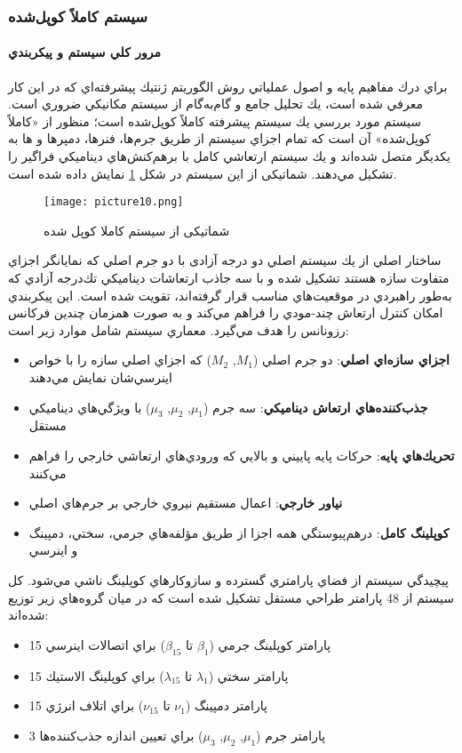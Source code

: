 \subsubsection{ سيستم كاملاً كوپل‌شده }
\paragraph{مرور كلي سيستم و پيكربندي}

براي درك مفاهيم پايه و اصول عملياتي روش الگوريتم ژنتيك پيشرفته‌اي كه در اين كار معرفي شده است، يك تحليل جامع و گام‌به‌گام از سيستم مكانيكي ضروري است. سيستم مورد بررسي يك سيستم پيشرفته كاملاً كوپل‌شده  است؛ منظور از «كاملاً كوپل‌شده» آن است كه تمام اجزاي سيستم از طريق جرم‌ها، فنرها، دمپرها و ‌ها به يكديگر متصل شده‌اند و يك سيستم ارتعاشي كامل با برهم‌كنش‌هاي ديناميكي فراگير را تشكيل مي‌دهند. شماتیکی از این سیستم در شکل 
\ref{fig:2DOF-3DOF schematic}
نمایش داده شده است. 

\begin{figure}
  \centering
  \texttt{[image: picture10.png]}
  \caption{شماتیکی از سیستم کاملا کوپل شده }\label{fig:2DOF-3DOF schematic}
\end{figure}


ساختار اصلي از يك سيستم اصلي دو درجه آزادی با دو جرم اصلي كه نمايانگر اجزاي متفاوت سازه هستند تشكيل شده و با سه جاذب‌ ارتعاشات ديناميكي  تك‌درجه آزادي كه به‌طور راهبردي در موقعيت‌هاي مناسب قرار گرفته‌اند، تقويت شده است. اين پيكربندي امكان كنترل ارتعاش چند-مودي را فراهم مي‌كند و به صورت همزمان چندين فركانس رزونانس را هدف مي‌گيرد. معماري سيستم شامل موارد زير است:

\begin{itemize}
    \item \textbf{اجزاي سازه‌اي اصلي}: دو جرم اصلي ($M_1$, $M_2$) كه اجزاي اصلي سازه را با خواص اينرسي‌شان نمايش مي‌دهند
    \item \textbf{جذب‌كننده‌هاي ارتعاش ديناميكي}: سه جرم  ($\mu_1$, $\mu_2$, $\mu_3$) با ويژگي‌هاي ديناميكي مستقل
    \item \textbf{تحريك‌هاي پايه}: حركات پايه پاييني و بالايي كه ورودي‌هاي ارتعاشي خارجي را فراهم مي‌كنند
    \item \textbf{نياور خارجي}: اعمال مستقيم نيروي خارجي بر جرم‌هاي اصلي
    \item \textbf{كوپلينگ كامل}: درهم‌پيوستگي همه اجزا از طريق مؤلفه‌هاي جرمي، سختي، دمپينگ و اينرسي
\end{itemize}

پيچيدگي سيستم از فضاي پارامتري گسترده و سازوكارهاي كوپلينگ ناشي مي‌شود. كل سيستم از 48 پارامتر طراحي مستقل تشكيل شده است كه در ميان گروه‌هاي زير توزيع شده‌اند:
\begin{itemize}
    \item 15 پارامتر كوپلينگ جرمي ($\beta_1$ تا $\beta_{15}$) براي اتصالات اينرسي
    \item 15 پارامتر سختي ($\lambda_1$ تا $\lambda_{15}$) براي كوپلينگ الاستيك
    \item 15 پارامتر دمپينگ ($\nu_1$ تا $\nu_{15}$) براي اتلاف انرژي
    \item 3 پارامتر جرم  ($\mu_1$, $\mu_2$, $\mu_3$) براي تعيين اندازه جذب‌كننده‌ها
\end{itemize}

